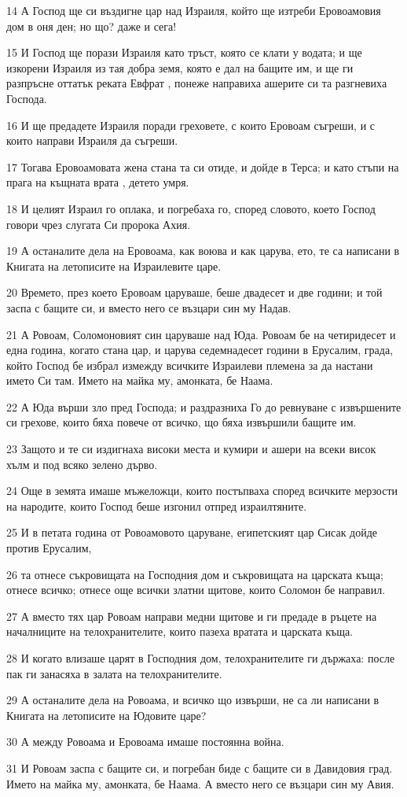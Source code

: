 \par 14 А Господ ще си въздигне цар над Израиля, който ще изтреби Еровоамовия дом в оня ден; но що? даже и сега!
\par 15 И Господ ще порази Израиля като тръст, която се клати у водата; и ще изкорени Израиля из тая добра земя, която е дал на бащите им, и ще ги разпръсне оттатък реката Евфрат , понеже направиха ашерите си та разгневиха Господа.
\par 16 И ще предадете Израиля поради греховете, с които Еровоам съгреши, и с които направи Израиля да съгреши.
\par 17 Тогава Еровоамовата жена стана та си отиде, и дойде в Терса; и като стъпи на прага на къщната врата , детето умря.
\par 18 И целият Израил го оплака, и погребаха го, според словото, което Господ говори чрез слугата Си пророка Ахия.
\par 19 А останалите дела на Еровоама, как воюва и как царува, ето, те са написани в Книгата на летописите на Израилевите царе.
\par 20 Времето, през което Еровоам царуваше, беше двадесет и две години; и той заспа с бащите си, и вместо него се възцари син му Надав.
\par 21 А Ровоам, Соломоновият син царуваше над Юда. Ровоам бе на четиридесет и една година, когато стана цар, и царува седемнадесет години в Ерусалим, града, който Господ бе избрал измежду всичките Израилеви племена за да настани името Си там. Името на майка му, амонката, бе Наама.
\par 22 А Юда върши зло пред Господа; и раздразниха Го до ревнуване с извършените си грехове, които бяха повече от всичко, що бяха извършили бащите им.
\par 23 Защото и те си издигнаха високи места и кумири и ашери на всеки висок хълм и под всяко зелено дърво.
\par 24 Още в земята имаше мъжеложци, които постъпваха според всичките мерзости на народите, които Господ беше изгонил отпред израилтяните.
\par 25 И в петата година от Ровоамовото царуване, египетският цар Сисак дойде против Ерусалим,
\par 26 та отнесе съкровищата на Господния дом и съкровищата на царската къща; отнесе всичко; отнесе още всички златни щитове, които Соломон бе направил.
\par 27 А вместо тях цар Ровоам направи медни щитове и ги предаде в ръцете на началниците на телохранителите, които пазеха вратата и царската къща.
\par 28 И когато влизаше царят в Господния дом, телохранителите ги държаха: после пак ги занасяха в залата на телохранителите.
\par 29 А останалите дела на Ровоама, и всичко що извърши, не са ли написани в Книгата на летописите на Юдовите царе?
\par 30 А между Ровоама и Еровоама имаше постоянна война.
\par 31 И Ровоам заспа с бащите си, и погребан биде с бащите си в Давидовия град. Името на майка му, амонката, бе Наама. А вместо него се възцари син му Авия.

